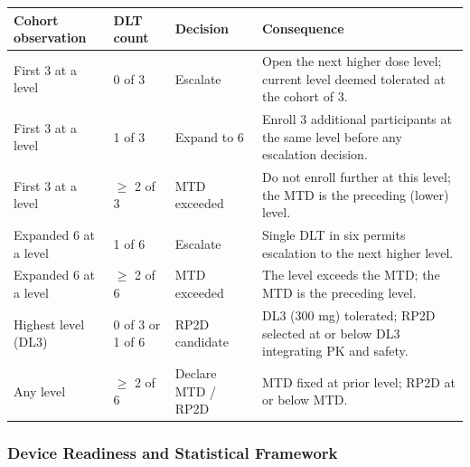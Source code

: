 \noindent\begin{tabularx}{\textwidth}{L{2.6cm} L{2.4cm} L{3.4cm} Y}
\toprule
\textbf{Cohort observation} & \textbf{DLT count} & \textbf{Decision} & \textbf{Consequence} \\
\midrule
First 3 at a level & 0 of 3 & Escalate & Open the next higher dose level; current level deemed tolerated at the cohort of 3. \\
\addlinespace
First 3 at a level & 1 of 3 & Expand to 6 & Enroll 3 additional participants at the same level before any escalation decision. \\
\addlinespace
First 3 at a level & $\geq$ 2 of 3 & MTD exceeded & Do not enroll further at this level; the MTD is the preceding (lower) level. \\
\addlinespace
Expanded 6 at a level & 1 of 6 & Escalate & Single DLT in six permits escalation to the next higher level. \\
\addlinespace
Expanded 6 at a level & $\geq$ 2 of 6 & MTD exceeded & The level exceeds the MTD; the MTD is the preceding level. \\
\addlinespace
Highest level (DL3) & 0 of 3 or 1 of 6 & RP2D candidate & DL3 (300 mg) tolerated; RP2D selected at or below DL3 integrating PK and safety. \\
\addlinespace
Any level & $\geq$ 2 of 6 & Declare MTD / RP2D & MTD fixed at prior level; RP2D at or below MTD. \\
\bottomrule
\end{tabularx}

\subsubsection{Device Readiness and Statistical Framework}


